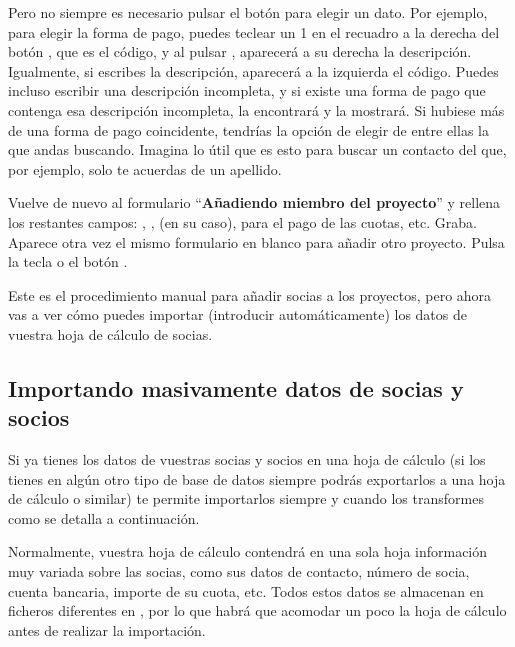 Pero no siempre es necesario pulsar el botón para elegir un dato. Por
ejemplo, para elegir la forma de pago, puedes teclear un 1 en el
recuadro a la derecha del botón ,
que es el código, y al pulsar ,
aparecerá a su derecha la descripción. Igualmente, si escribes la
descripción, aparecerá a la izquierda el código. Puedes incluso
escribir una descripción incompleta, y si existe una forma de pago
que contenga esa descripción incompleta, \appname la encontrará y
la mostrará. Si hubiese más de una forma de pago coincidente,
tendrías la opción de elegir de entre ellas la que andas buscando.
Imagina lo útil que es esto para buscar un contacto del que, por
ejemplo, solo te acuerdas de un apellido.

Vuelve de nuevo al formulario {\textquotedblleft}\textbf{Añadiendo
miembro del proyecto}{\textquotedblright} y rellena los restantes
campos: ,
, 
 (en su caso),
para el pago de las cuotas, etc.
Graba. Aparece otra vez el mismo formulario en blanco para añadir
otro proyecto. Pulsa la tecla  o el botón
.

Este es el procedimiento manual para añadir socias a los proyectos,
pero ahora vas a ver cómo puedes importar (introducir
automáticamente) los datos de vuestra hoja de cálculo de socias.

\subsection{Importando masivamente datos de socias y socios}
\label{ref:Importandomasivamente}Si ya tienes los datos de vuestras
socias y socios en una hoja de cálculo (si los tienes en algún otro
tipo de base de datos siempre podrás exportarlos a una hoja de
cálculo o similar) \appname te permite importarlos siempre y cuando
los transformes como se detalla a continuación.

Normalmente, vuestra hoja de cálculo contendrá en una sola hoja
información muy variada sobre las socias, como sus datos de contacto,
número de socia, cuenta bancaria, importe de su cuota, etc. Todos
estos datos se almacenan en ficheros diferentes en \appname, por lo que
habrá que acomodar un poco la hoja de cálculo antes de realizar la
importación. 

